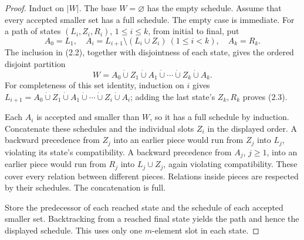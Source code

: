 \begin{proof}
Induct on \(|W|\). The base \(W=\varnothing\) has the empty schedule. Assume that every accepted smaller set has a full schedule. The empty case is immediate. For a path of states \((L_i,Z_i,R_i)\), \(1\leq i\leq k\), from initial to final, put \[
A_0=L_1,\quad
A_i=L_{i+1}\setminus(L_i\cup Z_i)\ (1\leq i<k),\quad
A_k=R_k.
\] The inclusion in (2.2), together with disjointness of each state, gives the ordered disjoint partition \[
W=A_0\mathbin{\dot\cup}Z_1\mathbin{\dot\cup}A_1
\mathbin{\dot\cup}\cdots\mathbin{\dot\cup}Z_k\mathbin{\dot\cup}A_k.
\tag{2.3}
\] For completeness of this set identity, induction on \(i\) gives \(L_{i+1}=A_0\dot\cup Z_1\dot\cup A_1\dot\cup\cdots\dot\cup Z_i\dot\cup A_i\); adding the last state's \(Z_k,R_k\) proves (2.3).

Each \(A_i\) is accepted and smaller than \(W\), so it has a full schedule by induction. Concatenate these schedules and the individual slots \(Z_i\) in the displayed order. A backward precedence from \(Z_j\) into an earlier piece would run from \(Z_j\) into \(L_j\), violating its state's compatibility. A backward precedence from \(A_j\), \(j\geq1\), into an earlier piece would run from \(R_j\) into \(L_j\cup Z_j\), again violating compatibility. These cover every relation between different pieces. Relations inside pieces are respected by their schedules. The concatenation is full.

Store the predecessor of each reached state and the schedule of each accepted smaller set. Backtracking from a reached final state yields the path and hence the displayed schedule. This uses only one \(m\)-element slot in each state.
\end{proof}


